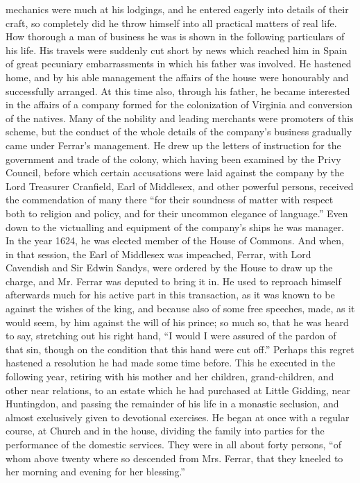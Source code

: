 mechanics were much at his lodgings, and he entered eagerly into details
of their craft, so completely did he throw himself into all practical
matters of real life. How thorough a man of business he was is shown in
the following particulars of his life. His travels were suddenly cut
short by news which reached him in Spain of great pecuniary
embarrassments in which his father was involved. He hastened home, and
by his able management the affairs of the house were honourably and
successfully arranged. At this time also, through his father, he became
interested in the affairs of a company formed for the colonization of
Virginia and conversion of the natives. Many of the nobility and leading
merchants were promoters of this scheme, but the conduct of the
whole details of the company's business gradually came under Ferrar's
management. He drew up the letters of instruction for the government and
trade of the colony, which having been examined by the Privy Council,
before which certain accusations were laid against the company by the
Lord Treasurer Cranfield, Earl of Middlesex, and other powerful persons,
received the commendation of many there ``for their soundness of matter
with respect both to religion and policy, and for their uncommon
elegance of language.'' Even down to the victualling and equipment of the
company's ships he was manager. In the year 1624, he was elected member
of the House of Commons. And when, in that session, the Earl of
Middlesex was impeached, Ferrar, with Lord Cavendish and Sir Edwin
Sandys, were ordered by the House to draw up the charge, and Mr. Ferrar
was deputed to bring it in. He used to reproach himself afterwards much
for his active part in this transaction, as it was known to be against
the wishes of the king, and because also of some free speeches, made, as
it would seem, by him against the will of his prince; so much so, that
he was heard to say, stretching out his right hand, ``I would I were
assured of the pardon of that sin, though on the condition that this
hand were cut off.'' Perhaps this regret hastened a resolution he had
made some time before. This he executed in the following year, retiring
with his mother and her children, grand-children, and other near
relations, to an estate which he had purchased at Little Gidding, near
Huntingdon, and passing the remainder of his life in a monastic
seclusion, and almost exclusively given to devotional exercises. He
began at once with a regular course, at Church and in the house,
dividing the family into parties for the performance of the domestic
services. They were in all about forty persons, ``of whom above twenty
where so descended from Mrs. Ferrar, that they kneeled to her morning
and evening for her blessing.''

